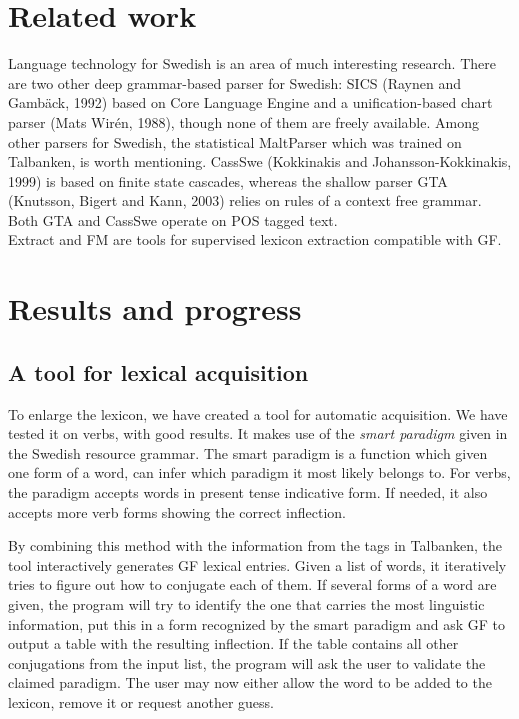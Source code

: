 \documentclass[submission]{eptcs} %
\begin{document}
\section{Related work}
Language technology for Swedish is an area of much interesting research.
There are two other deep grammar-based parser for Swedish:
SICS (Raynen and Gambäck, 1992) based on Core Language Engine and a
unification-based chart parser (Mats Wirén, 1988),
though none of them are freely available.
Among other parsers for Swedish, the statistical MaltParser\cite{malt}
which was trained on Talbanken, is worth mentioning. 
CassSwe (Kokkinakis and Johansson-Kokkinakis, 1999) is based on finite state cascades,
whereas the shallow parser GTA (Knutsson, Bigert and Kann, 2003) relies on rules of 
a context free grammar. Both GTA and CassSwe operate on POS tagged text.\\
Extract and FM\cite{MarkusForsberg2007} are tools for supervised lexicon
extraction compatible with GF.


\section{Results and progress}
\label{sec:progress}
\subsection{A tool for lexical acquisition}
To enlarge the lexicon, 
we have created a tool for automatic acquisition. We have
tested it on verbs, with good results. It makes use of
the \emph{smart paradigm} given in the Swedish resource grammar.
The smart paradigm is a function which given one form of a word, can
infer which paradigm it most likely belongs to.
For verbs, the paradigm accepts words in present tense indicative form.
If needed, it also accepts more verb forms showing the correct inflection.

By combining this method with the information from the tags in Talbanken,
the tool interactively generates GF lexical entries. 
Given a list of words, it iteratively
tries to figure out how to conjugate each of them. If several forms of a word are 
given, the program will try to identify the one that carries the most linguistic
information, put this in a form recognized by the smart paradigm and ask GF to output
a table with the resulting inflection. 
If the table contains all other conjugations from the input list,
the program will ask the  user to
validate the claimed paradigm. The user may now either
allow the word to be added to the lexicon, remove it or request another guess.
\end{document}
